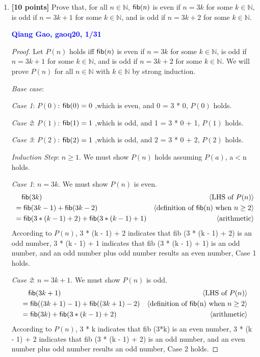 \documentclass[11pt,fleqn]{article}
\newcommand{\mname}[1]{\mbox{\sf #1}}
\newcommand{\pnote}[1]{{\langle \text{#1} \rangle}}
\begin{document}
\begin{enumerate}
\begin{proof}
Therefore, $P(n)$ holds for all $n \in \mathbb{N}$ by weak induction.
\end{proof}
  \bigskip

  \item \textbf{[10 points]} Prove that, for all $n \in \mathbb{N}$,
    $\mname{fib}(n)$ is even if $n = 3k$ for some $k \in \mathbb{N}$,
    is odd if $n = 3k + 1$ for some $k \in \mathbb{N}$, and is odd if
    $n = 3k + 2$ for some $k \in \mathbb{N}$.

  \bigskip

  \textcolor{blue}{\textbf{Qiang Gao, gaoq20, 1/31}}

 \begin{proof}
    Let $P(n)$ holds iff $\mname{fib}(n)$ is even if $n = 3k$ for some $k \in \mathbb{N}$, is odd if $n = 3k + 1$ for some $k \in \mathbb{N}$, and is odd if $n = 3k + 2$ for some $k \in \mathbb{N}$.
    We will prove $P(n)$ for all $n \in \mathbb{N}$ with $k \in \mathbb{N}$ by strong induction.

    \medskip
    \emph{Base case}:
    
    \emph{Case 1}: $P(0)$: $\mname{fib}(0) = 0$ ,which is even, and 0 = 3 * 0, $P(0)$ holds.

    \emph{Case 2}: $P(1)$: $\mname{fib}(1) = 1$ ,which is odd, and 1 = 3 * 0 + 1, $P(1)$ holds.
    
    \emph{Case 3}: $P(2)$: $\mname{fib}(2) = 1$ ,which is odd, and 2 = 3 * 0 + 2, $P(2)$ holds.

    \medskip
    \emph{Induction Step}: $n \ge 1$. We must show $P(n)$ holds assuming $P(a)$, a$<$n holds.
    
    \emph{Case 1}: $n = 3k$. We must show $P(n)$ is even.
    \begin{align*}
      & \phantom{{}=} \mname{fib}(3k)	& \pnote{LHS of $P(n)$}\\
      & = \mname{fib} (3k - 1) + \mname{fib} (3k - 2)		& \pnote{definition of \mname{fib}(n) when $n \ge 2$}\\
      & = \mname{fib} (3 * (k - 1) + 2) + \mname{fib} (3 * (k - 1) + 1)	& \pnote{arithmetic}
    \end{align*}
    According to $P(n)$, 3 * (k - 1) + 2 indicates that \mname{fib} (3 * (k - 1) + 2) is an odd number, 3 * (k - 1) + 1 indicates that \mname{fib} (3 * (k - 1) + 1) is an odd number,
    and an odd number plus odd number results an even number, Case 1 holds.

    \emph{Case 2}: $n = 3k + 1$. We must show $P(n)$ is odd.
    \begin{align*}
      & \phantom{{}=} \mname{fib}(3k + 1) & \pnote{LHS of $P(n)$}\\
      & = \mname{fib} ((3k + 1) - 1) + \mname{fib} ((3k + 1) - 2) & \pnote{definition of \mname{fib}(n) when $n \ge 2$}\\
      & = \mname{fib} (3k) + \mname{fib} (3 * (k - 1) + 2) & \pnote{arithmetic}
    \end{align*}
    According to $P(n)$, 3 * k indicates that \mname{fib} (3*k) is an even number, 3 * (k - 1) + 2 indicates that \mname{fib} (3 * (k - 1) + 2) is an odd number,
    and an even number plus odd number results an odd number, Case 2 holds.


\end{proof}
\end{enumerate}
\end{document}
